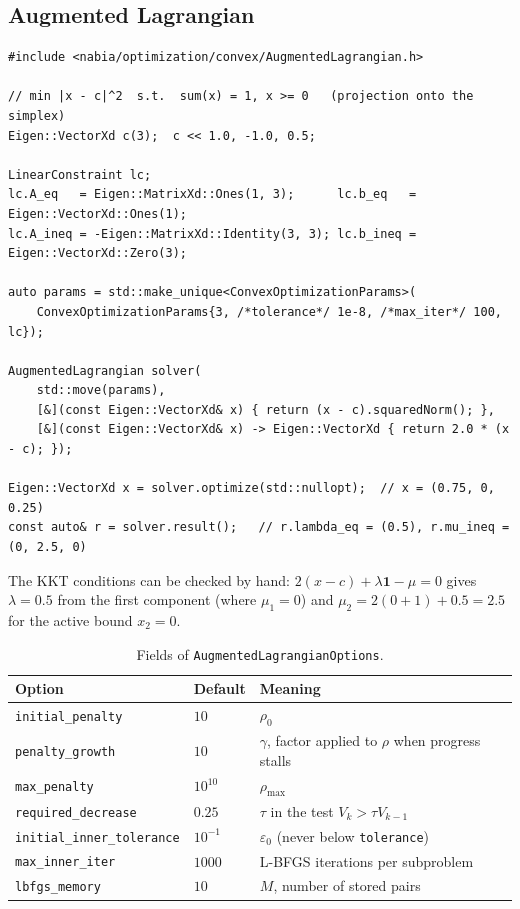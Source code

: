 \subsection{Augmented Lagrangian}
\begin{lstlisting}
#include <nabia/optimization/convex/AugmentedLagrangian.h>

// min |x - c|^2  s.t.  sum(x) = 1, x >= 0   (projection onto the simplex)
Eigen::VectorXd c(3);  c << 1.0, -1.0, 0.5;

LinearConstraint lc;
lc.A_eq   = Eigen::MatrixXd::Ones(1, 3);      lc.b_eq   = Eigen::VectorXd::Ones(1);
lc.A_ineq = -Eigen::MatrixXd::Identity(3, 3); lc.b_ineq = Eigen::VectorXd::Zero(3);

auto params = std::make_unique<ConvexOptimizationParams>(
    ConvexOptimizationParams{3, /*tolerance*/ 1e-8, /*max_iter*/ 100, lc});

AugmentedLagrangian solver(
    std::move(params),
    [&](const Eigen::VectorXd& x) { return (x - c).squaredNorm(); },
    [&](const Eigen::VectorXd& x) -> Eigen::VectorXd { return 2.0 * (x - c); });

Eigen::VectorXd x = solver.optimize(std::nullopt);  // x = (0.75, 0, 0.25)
const auto& r = solver.result();   // r.lambda_eq = (0.5), r.mu_ineq = (0, 2.5, 0)
\end{lstlisting}
The KKT conditions can be checked by hand:
$2(x-c)+\lambda\mathbf{1}-\mu = 0$ gives $\lambda=0.5$ from the first
component (where $\mu_1=0$) and $\mu_2 = 2(0+1)+0.5=2.5$ for the active bound
$x_2=0$.

\begin{table}[ht]
\centering
\begin{tabular}{@{}llp{6.5cm}@{}}
\toprule
Option & Default & Meaning \\
\midrule
\texttt{initial\_penalty} & $10$ & $\rho_0$ \\
\texttt{penalty\_growth} & $10$ & $\gamma$, factor applied to $\rho$ when progress stalls \\
\texttt{max\_penalty} & $10^{10}$ & $\rho_{\max}$ \\
\texttt{required\_decrease} & $0.25$ & $\tau$ in the test $V_k>\tau V_{k-1}$ \\
\texttt{initial\_inner\_tolerance} & $10^{-1}$ & $\varepsilon_0$ (never below \texttt{tolerance}) \\
\texttt{max\_inner\_iter} & $1000$ & L-BFGS iterations per subproblem \\
\texttt{lbfgs\_memory} & $10$ & $M$, number of stored pairs \\
\bottomrule
\end{tabular}
\caption{Fields of \texttt{AugmentedLagrangianOptions}.}
\end{table}

